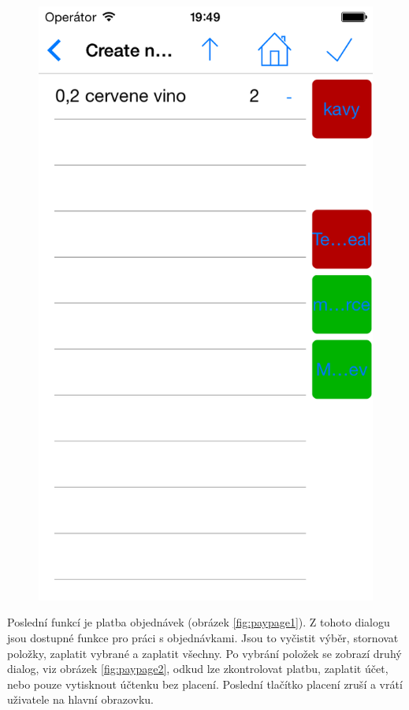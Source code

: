 \begin{figure}
\begin{minipage}{.5\textwidth}
  \centering
  \includegraphics[width=.95\textwidth]{order2.png}
  \label{fig:createorderpage2}
\end{minipage}
\end{figure}

Poslední funkcí je platba objednávek (obrázek \ref{fig:paypage1}).
Z tohoto dialogu jsou dostupné funkce pro práci s objednávkami.
Jsou to vyčistit výběr, stornovat položky, zaplatit vybrané a zaplatit všechny.
Po vybrání položek se zobrazí druhý dialog, viz obrázek \ref{fig:paypage2}, odkud lze zkontrolovat platbu, zaplatit účet, nebo pouze vytisknout účtenku bez placení.
Poslední tlačítko placení zruší a vrátí uživatele na hlavní obrazovku.

